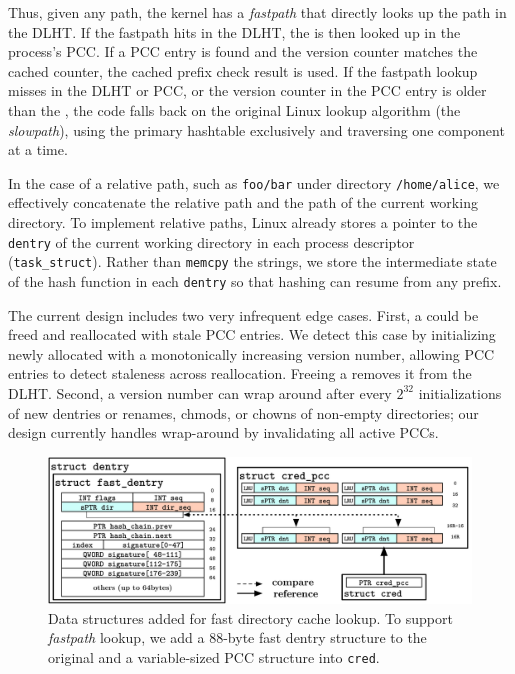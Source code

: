 Thus, given any path, the kernel
has a {\em fastpath} that directly looks up the path
in the DLHT.
If the fastpath hits in the DLHT,
the \dentry{} is then looked up in the process's PCC.
If a PCC entry is found and the version counter matches 
the cached counter, the cached prefix check result is used.
If the fastpath lookup misses in the DLHT or PCC, 
or the version counter in the PCC entry is older than the \dentry{}, 
the code falls back on the original 
Linux lookup algorithm (the {\em slowpath}),
using the primary hashtable exclusively and traversing one component at a time.

In the case of a relative path, such as {\tt foo/bar} under directory {\tt /home/alice},
we effectively concatenate the relative path and the path of the current working directory.
To implement relative paths, Linux already stores 
a pointer to the {\tt dentry} of the current working directory
in each process descriptor ({\tt task\_struct}).
Rather than {\tt memcpy} the strings, we store the intermediate state of the hash function 
in each {\tt dentry} so that hashing can resume from any prefix.

The current design includes two very infrequent edge cases.
First, a \dentry{} could be freed and reallocated with stale PCC entries.
We detect this case by initializing newly allocated \dentries{} with
a monotonically increasing version number,
allowing PCC entries to detect staleness across reallocation.
Freeing a \dentry{} removes it from the DLHT.
Second, a version number can wrap around after every $2^{32}$ initializations of new dentries or
renames, chmods, or chowns
of non-empty directories; 
our design currently handles wrap-around by invalidating all active PCCs.

\begin{figure}[t!]
\centering
\includegraphics[width=5.5in]{dcache/figures/dcache-data_structure.pdf}
\footnotesize
\caption[Data structures added in Linux for directory cache optimization]
{Data structures added for fast directory cache lookup. To support {\em fastpath} lookup, we add a 88-byte fast dentry structure to the original \dentry{} and a variable-sized PCC structure into {\tt cred}. 
}
\label{fig:dcache-data-structure}
\end{figure}

